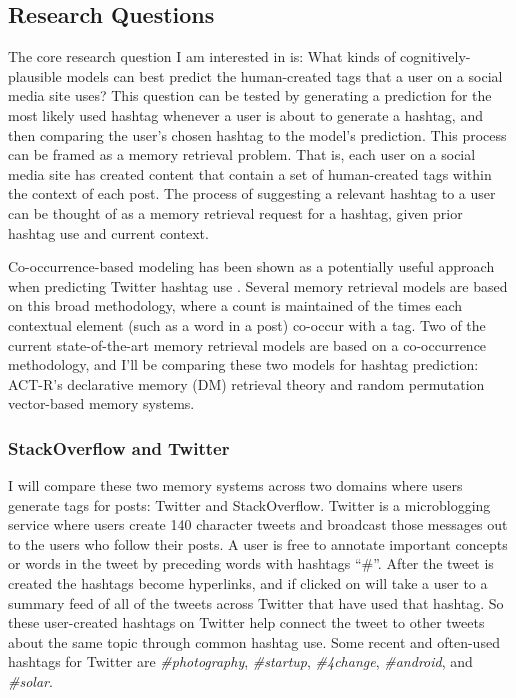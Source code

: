 \documentclass[man,floatsintext,donotrepeattitle]{apa6}
\begin{document}
\subsection{Research Questions}

The core research question I am interested in is:
What kinds of cognitively-plausible models can best predict the human-created tags that a user on a social media site uses?
This question can be tested by generating a prediction for the most likely used hashtag whenever a user is about to generate a hashtag, and then comparing the user's chosen hashtag to the model's prediction.
This process can be framed as a memory retrieval problem.
That is, each user on a social media site has created content that contain a set of human-created tags within the context of each post.
The process of suggesting a relevant hashtag to a user can be thought of as a memory retrieval request for a hashtag, given prior hashtag use and current context.

Co-occurrence-based modeling has been shown as a potentially useful approach when predicting Twitter hashtag use \parencite{Efron2010}.
Several memory retrieval models are based on this broad methodology, where a count is maintained of the times each contextual element (such as a word in a post) co-occur with a tag.
Two of the current state-of-the-art memory retrieval models are based on a co-occurrence methodology, and I'll be comparing these two models for hashtag prediction:
ACT-R's declarative memory (DM) retrieval theory and random permutation vector-based memory systems.

\subsubsection{StackOverflow and Twitter}

I will compare these two memory systems across two domains where users generate tags for posts: Twitter and StackOverflow.
Twitter is a microblogging service where users create 140 character tweets and broadcast those messages out to the users who follow their posts.
A user is free to annotate important concepts or words in the tweet by preceding words with hashtags ``\#''.
After the tweet is created the hashtags become hyperlinks, and if clicked on will take a user to a summary feed of all of the tweets across Twitter that have used that hashtag.
So these user-created hashtags on Twitter help connect the tweet to other tweets about the same topic through common hashtag use.
Some recent and often-used hashtags for Twitter are \emph{\#photography}, \emph{\#startup}, \emph{\#4change}, \emph{\#android}, and \emph{\#solar}.
\end{document}
